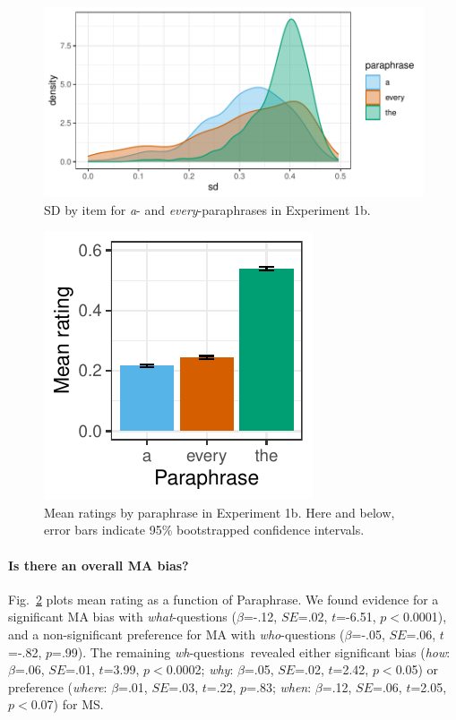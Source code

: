 \documentclass[12pt,letterpaper,table,svgnames,dvipsnames]{article}
\newcommand{\figref}[1]{Fig.~\ref{#1}}
\newcommand{\whqs}{\emph{wh}-questions~}
\begin{document}
\begin{figure}[h!]
\centering
\includegraphics[scale=1]{figures/ex1b_denisty_sd.pdf}
\caption{SD by item for \emph{a}- and \emph{every}-paraphrases in Experiment 1b.}
\label{ex1b_density_sd}
\end{figure}

\begin{figure}[h!]
\centering
\includegraphics[scale=1]{figures/overall_eq_context.pdf}
\caption{Mean ratings by paraphrase in Experiment 1b. Here and below, error bars indicate 95\% bootstrapped confidence intervals.}
\label{ex1b_overall}
\end{figure}


\paragraph{Is there an overall MA bias?}
\figref{ex1b_overall} plots mean rating as a function of Paraphrase. We found evidence for a significant MA bias with \emph{what}-questions ($\beta$=-.12, $SE$=.02, $t$=-6.51, $p<$0.0001), and a non-significant preference for MA with \emph{who}-questions ($\beta$=-.05, $SE$=.06, $t$=-.82, $p$=.99). The remaining \whqs revealed either significant bias (\emph{how}: $\beta$=.06, $SE$=.01, $t$=3.99, $p<$0.0002; \emph{why}: $\beta$=.05, $SE$=.02, $t$=2.42, $p<$0.05) or preference (\emph{where}: $\beta$=.01, $SE$=.03, $t$=.22, $p$=.83; \emph{when}: $\beta$=.12, $SE$=.06, $t$=2.05, $p<$0.07) for MS. 
\end{document}
